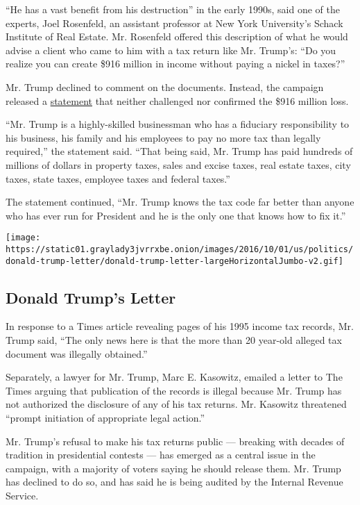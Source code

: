 ``He has a vast benefit from his destruction'' in the early 1990s, said
one of the experts, Joel Rosenfeld, an assistant professor at New York
University's Schack Institute of Real Estate. Mr. Rosenfeld offered this
description of what he would advise a client who came to him with a tax
return like Mr. Trump's: ``Do you realize you can create \$916 million
in income without paying a nickel in taxes?''

Mr. Trump declined to comment on the documents. Instead, the campaign
released a
\href{http://www.nytimes3xbfgragh.onion/interactive/2016/10/01/us/politics/donald-trump-letter.html}{statement}
that neither challenged nor confirmed the \$916 million loss.

``Mr. Trump is a highly-skilled businessman who has a fiduciary
responsibility to his business, his family and his employees to pay no
more tax than legally required,'' the statement said. ``That being said,
Mr. Trump has paid hundreds of millions of dollars in property taxes,
sales and excise taxes, real estate taxes, city taxes, state taxes,
employee taxes and federal taxes.''

The statement continued, ``Mr. Trump knows the tax code far better than
anyone who has ever run for President and he is the only one that knows
how to fix it.''

\href{https://www.nytimes3xbfgragh.onion/interactive/2016/10/01/us/politics/donald-trump-letter.html}{}

\texttt{[image: https://static01.graylady3jvrrxbe.onion/images/2016/10/01/us/politics/donald-trump-letter/donald-trump-letter-largeHorizontalJumbo-v2.gif]}

\hypertarget{donald-trumps-letter}{%
\subsection{Donald Trump's Letter}\label{donald-trumps-letter}}

In response to a Times article revealing pages of his 1995 income tax
records, Mr. Trump said, ``The only news here is that the more than 20
year-old alleged tax document was illegally obtained.''

Separately, a lawyer for Mr. Trump, Marc E. Kasowitz, emailed a letter
to The Times arguing that publication of the records is illegal because
Mr. Trump has not authorized the disclosure of any of his tax returns.
Mr. Kasowitz threatened ``prompt initiation of appropriate legal
action.''

Mr. Trump's refusal to make his tax returns public --- breaking with
decades of tradition in presidential contests --- has emerged as a
central issue in the campaign, with a majority of voters saying he
should release them. Mr. Trump has declined to do so, and has said he is
being audited by the Internal Revenue Service.

